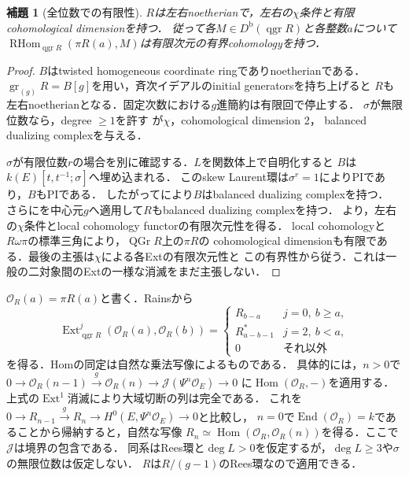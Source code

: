\documentclass[11pt,a4paper]{ltjsarticle}
\newtheorem{lemma}[theorem]{補題}
\theoremstyle{definition}
\newcommand{\OO}{\mathcal O}
\newcommand{\Db}{D^{\mathrm b}}
\newcommand{\RHom}{\operatorname{RHom}}
\newcommand{\Hom}{\operatorname{Hom}}
\newcommand{\Ext}{\operatorname{Ext}}
\newcommand{\End}{\operatorname{End}}
\newcommand{\qgr}{\operatorname{qgr}}
\newcommand{\QGr}{\operatorname{QGr}}
\begin{document}
\begin{lemma}[全位数での有限性]\label{lem:finiteness}
$R$は左右noetherianで，左右の$\chi$条件と有限cohomological dimensionを持つ．
従って各$M\in\Db(\qgr R)$と各整数$a$について
$\RHom_{\qgr R}(\pi R(a),M)$は有限次元の有界cohomologyを持つ．
\end{lemma}
\begin{proof}
$B$はtwisted homogeneous coordinate ringでありnoetherianである．
$\operatorname{gr}_{(g)}R=B[g]$を用い，斉次イデアルのinitial generatorsを持ち上げると
$R$も左右noetherianとなる．固定次数における$g$進簡約は有限回で停止する．
$\sigma$が無限位数なら，degree $\geq1$を許す
\cite[Proposition~2.4]{RSSBlow}が$\chi$，cohomological dimension 2，
balanced dualizing complexを与える．

$\sigma$が有限位数$r$の場合を別に確認する．$L$を関数体上で自明化すると
$B$は$k(E)[t,t^{-1};\sigma]$へ埋め込まれる．
このskew Laurent環は$\sigma^r=1$によりPIであり，$B$もPIである．
したがって\cite[Theorem~5.13]{YZ}により$B$はbalanced dualizing complexを持つ．
さらに\cite[Theorem~5.1(1)]{YZ}を中心元$g$へ適用して$R$もbalanced dualizing complexを持つ．
\cite[Theorem~4.5]{YZ}より，左右の$\chi$条件とlocal cohomology functorの有限次元性を得る．
local cohomologyと$R\omega\pi$の標準三角により，$\QGr R$上の$\pi R$の
cohomological dimensionも有限である．最後の主張は$\chi$による各Extの有限次元性と
この有界性から従う．これは一般の二対象間のExtの一様な消滅をまだ主張しない．
\end{proof}

$\OO_R(a)=\pi R(a)$と書く．Rains\cite[Corollary~3.8とその証明]{RF}から
\begin{equation}\label{eq:target-ext}
 \Ext^j_{\qgr R}(\OO_R(a),\OO_R(b))=
 \begin{cases}
 R_{b-a}&j=0,\ b\geq a,\\
 R_{a-b-1}^*&j=2,\ b<a,\\
 0&\text{それ以外}
 \end{cases}
\end{equation}
を得る．Homの同定は自然な乗法写像によるものである．
具体的には，$n>0$で
$0\to\OO_R(n-1)\xrightarrow{g}\OO_R(n)\to\mathcal J(\Psi^n\OO_E)\to0$
に$\Hom(\OO_R,-)$を適用する．上式の$\Ext^1$消滅により大域切断の列は完全である．
これを$0\to R_{n-1}\xrightarrow{g}R_n\to H^0(E,\Psi^n\OO_E)\to0$と比較し，
$n=0$で$\End(\OO_R)=k$であることから帰納すると，自然な写像
$R_n\simeq\Hom(\OO_R,\OO_R(n))$を得る．ここで$\mathcal J$は境界の包含である．
同系はRees環と$\deg L>0$を仮定するが，$\deg L\geq3$や$\sigma$の無限位数は仮定しない．
$R$は$R/(g-1)$のRees環なので適用できる．
\end{document}
